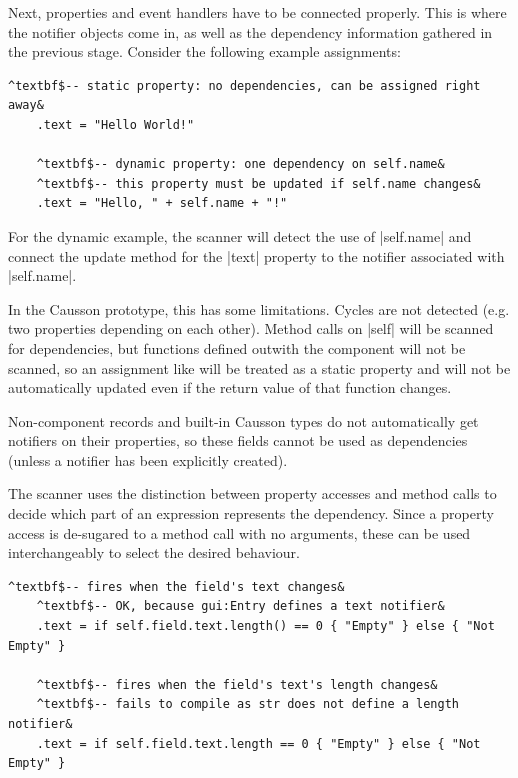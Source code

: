 \documentclass[11pt]{report}
\begin{document}
Next, properties and event handlers have to be connected properly. This is where the notifier objects come in, as well as the dependency information gathered in the previous stage. Consider the following example assignments:

\begin{Verbatim}[commandchars=^$&]
    ^textbf$-- static property: no dependencies, can be assigned right away&
    .text = "Hello World!"
    
    ^textbf$-- dynamic property: one dependency on self.name&
    ^textbf$-- this property must be updated if self.name changes&
    .text = "Hello, " + self.name + "!"
\end{Verbatim}

For the dynamic example, the scanner will detect the use of |self.name| and connect the update method for the |text| property to the notifier associated with |self.name|.

In the Causson prototype, this has some limitations. Cycles are not detected (e.g. two properties depending on each other). Method calls on |self| will be scanned for dependencies, but functions defined outwith the component will not be scanned, so an assignment like  will be treated as a static property and will not be automatically updated even if the return value of that function changes.

Non-component records and built-in Causson types do not automatically get notifiers on their properties, so these fields cannot be used as dependencies (unless a notifier has been explicitly created).

The scanner uses the distinction between property accesses and method calls to decide which part of an expression represents the dependency. Since a property access is de-sugared to a method call with no arguments, these can be used interchangeably to select the desired behaviour.

\begin{Verbatim}[commandchars=^$&]
    ^textbf$-- fires when the field's text changes&
    ^textbf$-- OK, because gui:Entry defines a text notifier&
    .text = if self.field.text.length() == 0 { "Empty" } else { "Not Empty" }

    ^textbf$-- fires when the field's text's length changes&
    ^textbf$-- fails to compile as str does not define a length notifier&
    .text = if self.field.text.length == 0 { "Empty" } else { "Not Empty" }
\end{Verbatim}
\end{document}
